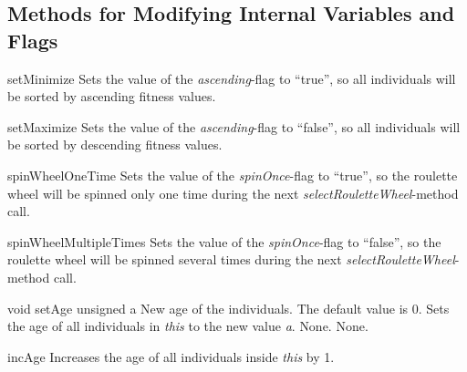 \subsection{Methods for Modifying Internal Variables and Flags}

\setNormalInstance
\printEmptyMethod
{setMinimize}
{Sets the value of the {\em ascending}-flag to ``true'', so all
 individuals will be sorted by ascending fitness values.}

\vspace*{4ex}

\setNormalInstance
\printEmptyMethod
{setMaximize}
{Sets the value of the {\em ascending}-flag to ``false'', so all
 individuals will be sorted by descending fitness values.}

\clearpage

\setNormalInstance
\printEmptyMethod
{spinWheelOneTime}
{Sets the value of the {\em spinOnce}-flag to ``true'', so the
 roulette wheel will be spinned only one time during the next
 {\em selectRouletteWheel}-method call.}

\vspace*{4ex}

\setNormalInstance
\printEmptyMethod
{spinWheelMultipleTimes}
{Sets the value of the {\em spinOnce}-flag to ``false'', so the
 roulette wheel will be spinned several times during the next
 {\em selectRouletteWheel}-method call.}

\vspace*{4ex}

\setNormalInstance
\printMethodWithOneParam
{void}
{setAge}
{unsigned}
{a}
{New age of the individuals. The default value is 0.}
{Sets the age of all individuals in {\em this} to the new value
 {\em a}.}
{None.}
{None.}

\vspace*{4ex}

\setNormalInstance
\printEmptyMethod
{incAge}
{Increases the age of all individuals inside {\em this} by 1.}








